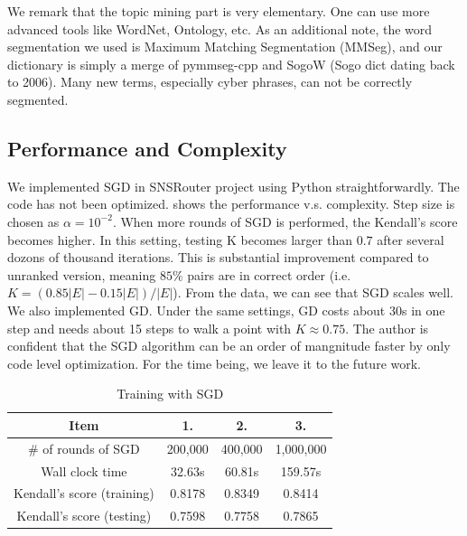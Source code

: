\documentclass{sig-alternate}
\begin{document}
We remark that the topic mining part is very elementary. 
One can use more advanced tools like WordNet, Ontology, etc. 
As an additional note, the word segmentation we used is 
Maximum Matching Segmentation (MMSeg), and our dictionary is 
simply a merge of pymmseg-cpp and SogoW (Sogo dict dating back to 2006). 
Many new terms, especially cyber phrases, can not be correctly segmented. 

\subsection{Performance and Complexity}
\label{sec:Performance and Complexity}

We implemented SGD in SNSRouter project using Python straightforwardly. 
The code has not been optimized.
\rtbl{\ref{tbl:sgd_train}} shows the performance v.s. complexity. 
Step size is chosen as $\alpha = 10^{-2}$. 
When more rounds of SGD is performed, the Kendall's score becomes higher. 
In this setting, testing K becomes larger than $0.7$ after 
several dozons of thousand iterations. 
This is substantial improvement compared to unranked version, 
meaning $85\%$ pairs are in correct order 
(i.e. $K = (0.85 |E| - 0.15 |E|) / |E|$). 
From the data, we can see that SGD scales well. 
We also implemented GD.
Under the same settings, 
GD costs about 30s in one step and 
needs about 15 steps to walk a point with $K \approx 0.75$. 
The author is confident that the SGD algorithm can be 
an order of mangnitude faster by only code level optimization. 
For the time being, we leave it to the future work. 

\begin{table}[htb]
	\centering
	\caption{Training with SGD}
	\label{tbl:sgd_train}
	\begin{tabular}{c|c|c|c}
	\hline
	Item & 1. & 2. & 3. \\
	\hline
	\# of rounds of SGD & 200,000 & 400,000 & 1,000,000\\
	Wall clock time & 32.63s & 60.81s & 159.57s\\
	Kendall's score (training) & 0.8178 & 0.8349 & 0.8414\\
	Kendall's score (testing) & 0.7598 & 0.7758 & 0.7865\\
	\hline
	\end{tabular}
\end{table}
\end{document}
